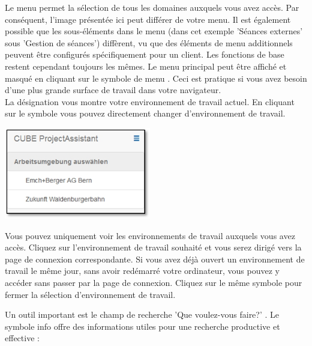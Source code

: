 Le menu permet la sélection de tous les domaines auxquels vous avez accès. Par conséquent, l'image présentée ici peut différer de votre menu. Il est également possible que les sous-éléments dans le menu (dans cet exemple 'Séances externes' sous 'Gestion de séances') diffèrent, vu que des éléments de menu additionnels peuvent être configurés spécifiquement pour un client. Les fonctions de base restent cependant toujours les mêmes. Le menu principal peut être affiché et masqué en cliquant sur le symbole de menu . Ceci est pratique si vous avez besoin d'une plus grande surface de travail dans votre navigateur. \\
La désignation  vous montre votre environnement de travail actuel. En cliquant sur le symbole  vous pouvez directement changer d'environnement de travail.

\vspace{\baselineskip}

\begin{raggedleft}
\hspace{80mm} \includegraphics[height=40mm]{../chapters/02_GettingStarted/pictures/2-5-1_Arbeitsumgebung_wechseln.jpg}
\end{raggedleft}

\vspace{\baselineskip}

Vous pouvez uniquement voir les environnements de travail auxquels vous avez accès. Cliquez sur l'environnement de travail souhaité et vous serez dirigé vers la page de connexion correspondante. Si vous avez déjà ouvert un environnement de travail le même jour, sans avoir redémarré votre ordinateur, vous pouvez y accéder sans passer par la page de connexion. Cliquez sur le même symbole  pour fermer la sélection d'environnement de travail. 

\vspace{\baselineskip}

Un outil important est le champ de recherche 'Que voulez-vous faire?' . Le symbole info  offre des informations utiles pour une recherche productive et effective :

